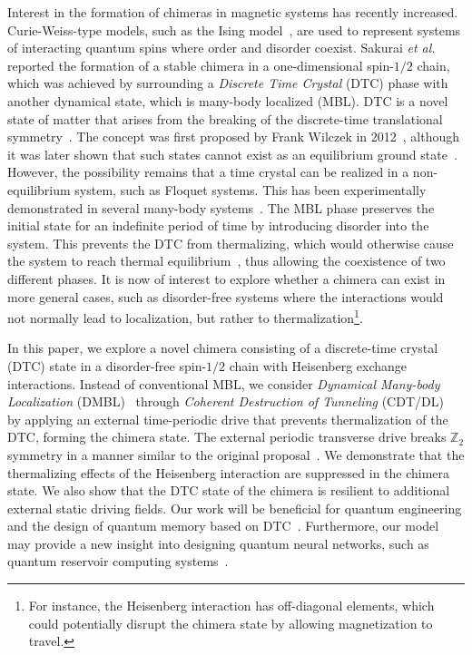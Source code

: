 \documentclass[12pt]{iopart}
\begin{document}
Interest in the formation of chimeras in magnetic systems has recently increased. Curie-Weiss-type models, such as the Ising model~\cite{singh_chimera_2011}, are used to represent systems of interacting quantum spins where order and disorder coexist. Sakurai \textit{et al.}~\cite{sakurai_phys_nodate} reported the formation of a stable chimera in a one-dimensional spin-$1/2$ chain, which was achieved by surrounding a \textit{Discrete Time Crystal} (DTC) phase with another dynamical state, which is many-body localized (MBL). DTC is a novel state of matter that arises from the breaking of the discrete-time translational symmetry~\cite{else_floquet_2016}. The concept was first proposed by Frank Wilczek in 2012~\cite{wilczek_quantum_2012}, although it was later shown that such states cannot exist as an equilibrium ground state~\cite{Bruno_comment_1, Bruno2013, watanabe_absence_2015}. However, the possibility remains that a time crystal can be realized in a non-equilibrium system, such as Floquet systems. This has been experimentally demonstrated in several many-body systems~\cite{huang2018,taheri_all-optical_2022, Soham2018, zhang_observation_2017, yao_time_2018,frey_realization_2022, rovny_observation_2018, sacha_time_nodate,golletz_basis_2022}. The MBL phase preserves the initial state for an indefinite period of time by introducing disorder into the system. This prevents the DTC from thermalizing, which would otherwise cause the system to reach thermal equilibrium~\cite{zhang_observation_2017,alet_many-body_2018,else_floquet_2016,smith_many-body_2016,nguyen_signature_2021}, thus allowing the coexistence of two different phases. It is now of interest to explore whether a chimera can exist in more general cases, such as disorder-free systems where the interactions would not normally lead to localization, but rather to thermalization\footnote{For instance, the Heisenberg interaction has off-diagonal elements, which could potentially disrupt the chimera state by allowing magnetization to travel.}.

In this paper, we explore a novel chimera consisting of a discrete-time crystal (DTC) state in a disorder-free spin-$1/2$ chain with Heisenberg exchange interactions. Instead of conventional MBL, we consider \textit{Dynamical Many-body Localization} (DMBL)~\cite{Keser2016, haldar_dynamical_2017,haldar_dynamical_2021,bhattacharyya_transverse_2012,aditya2023dynamical,dutta2014,das_exotic_2010} through \textit{Coherent Destruction of Tunneling} (CDT/DL)~\cite{Grossmann1991,Kayanuma2008} by applying an external time-periodic drive that prevents thermalization of the DTC, forming the chimera state. The external periodic transverse drive breaks $\mathbb{Z}_2$ symmetry in a manner similar to the original proposal~\cite{sakurai_phys_nodate}. We demonstrate that the thermalizing effects of the Heisenberg interaction are suppressed in the chimera state. We also show that the DTC state of the chimera is resilient to additional external static driving fields. Our work will be beneficial for quantum engineering and the design of quantum memory based on DTC~\cite{zhang_observation_2017}. Furthermore, our model may provide a new insight into designing quantum neural networks, such as quantum reservoir computing systems~\cite{Fujii_2017, Martinez_2021,Mujal_2021, Akitada2022}.
\end{document}
